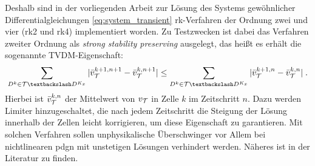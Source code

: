 Deshalb sind in der vorliegenden Arbeit zur Lösung des Systems gewöhnlicher Differentialgleichungen \eqref{eq:system_transient} \ac{rk}-Verfahren der Ordnung zwei und vier (\ac{rk}2 und \ac{rk}4) implementiert worden. Zu Testzwecken ist dabei das Verfahren zweiter Ordnung als \emph{strong stability preserving} ausgelegt, das heißt es erhält die sogenannte TVDM-Eigenschaft:
\begin{equation*}
  \sum_{D^k\in\mathcal{T}\textbackslash D^{K_x}} |\bar{v}\fin^{k+1,n+1} - \bar{v}\fin^{k,n+1}| \leq\sum_{D^k\in\mathcal{T}\textbackslash D^{K_x}} |\bar{v}\fin^{k+1,n} - \bar{v}\fin^{k,n}| \; .
\end{equation*}
Hierbei ist $\bar{v}_{\mathcal{T}}^{k,n}$ der Mittelwert von $v_{\mathcal{T}}$ in Zelle $k$ im Zeitschritt $n$. Dazu werden Limiter hinzugeschaltet, die nach jedem Zeitschritt die Steigung der Lösung innerhalb der Zellen leicht korrigieren, um diese Eigenschaft zu garantieren. Mit solchen Verfahren sollen unphysikalische Überschwinger vor Allem bei nichtlinearen \ac{pdg}n mit unstetigen Lösungen verhindert werden. Näheres ist in der Literatur \cite{buch} zu finden.

